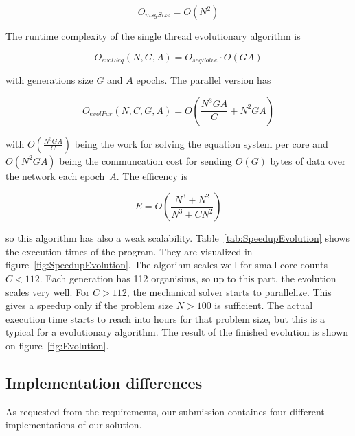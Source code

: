 \documentclass[12pt]{article}
\begin{document}
\begin{equation}
    O_{msgSize} = O(N^2)
\end{equation}

The runtime complexity of the single thread evolutionary algorithm is

\begin{equation}
    O_\mathit{evolSeq}(N, G, A) = O_\textit{seqSolve} \cdot O(G A)
\end{equation}

with generations size $G$ and $A$ epochs. The parallel version has

\begin{equation}
    O_\mathit{evolPar}(N, C, G, A) = O \left( \frac{N^3 G A}{C} + N^2 G A\right)
\end{equation}

with $O (\frac{N^3 G A}{C} )$ being the work for solving the equation system per core and $O(N^2 G A)$ being the communcation cost for sending $O(G)$ bytes of data over the network each epoch~$A$. The efficency is

\begin{equation}
    E = O \left(\frac{N^3 + N^2}{N^3+C N^2}\right)
\end{equation}

so this algorithm has also a weak scalability. Table~\ref{tab:SpeedupEvolution} shows the execution times of the program. They are visualized in figure~\ref{fig:SpeedupEvolution}. The algorihm scales well for small core counts $C < 112$. Each generation has 112 organisims, so up to this part, the evolution scales very well. For $C > 112$, the mechanical solver starts to parallelize. This gives a speedup only if the problem size $N > 100$ is sufficient. The actual execution time starts to reach into hours for that problem size, but this is a typical for a evolutionary algorithm. The result of the finished evolution is shown on figure~\ref{fig:Evolution}.

\subsection{Implementation differences}

As requested from the requirements, our submission containes four different implementations of our solution.
\end{document}
